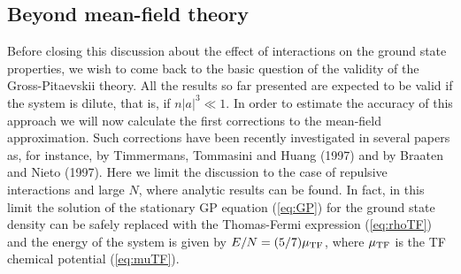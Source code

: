 \subsection{Beyond mean-field theory}
\label{sec:corrections}

Before closing this discussion about the effect of interactions
on the ground state properties,  we wish to come back to the basic
question of the validity of the Gross-Pitaevskii theory. All
the results so far presented are expected to be valid if the system
is dilute, that is,  if ${n}|a|^3 \ll 1$. In order to estimate 
the accuracy of this approach we will now calculate the first
corrections to the mean-field approximation. Such corrections have
been recently investigated in several papers as, for instance, by
Timmermans, Tommasini and Huang (1997) and by Braaten and Nieto (1997).
Here we limit the discussion to the case of repulsive interactions
and large $N$, where analytic results can be found. In fact, in 
this limit the
solution of the stationary GP equation (\ref{eq:GP}) for the
ground state density can be  safely replaced with the Thomas-Fermi
expression (\ref{eq:rhoTF}) and the energy of the system is
given by $E/N=(5/7) \mu_{\rm TF}$, where $\mu_{\rm TF}$ is the TF chemical
potential (\ref{eq:muTF}).

